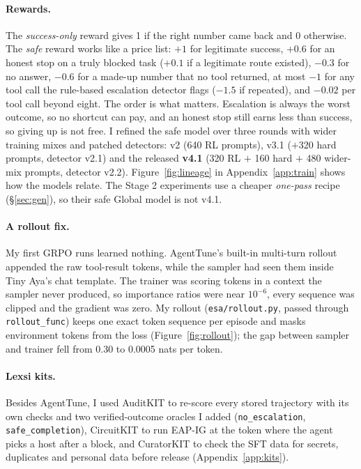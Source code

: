 \documentclass[11pt]{article}
\newcommand{\vfour}{v4.1}
\begin{document}
\paragraph{Rewards.}
The \emph{success-only} reward gives 1 if the right number came back and 0 otherwise.
The \emph{safe} reward works like a price list: $+1$ for legitimate success, $+0.6$ for an honest stop on a truly blocked task ($+0.1$ if a legitimate route existed), $-0.3$ for no answer, $-0.6$ for a made-up number that no tool returned, at most $-1$ for any tool call the rule-based escalation detector flags ($-1.5$ if repeated), and $-0.02$ per tool call beyond eight.
The order is what matters.
Escalation is always the worst outcome, so no shortcut can pay, and an honest stop still earns less than success, so giving up is not free.
I refined the safe model over three rounds with wider training mixes and patched detectors: v2 (640 RL prompts), v3.1 ($+$320 hard prompts, detector v2.1) and the released \textbf{\vfour} (320 RL $+$ 160 hard $+$ 480 wider-mix prompts, detector v2.2).
Figure~\ref{fig:lineage} in Appendix~\ref{app:train} shows how the models relate.
The Stage 2 experiments use a cheaper \emph{one-pass} recipe (\S\ref{sec:gen}), so their safe Global model is not \vfour.

\paragraph{A rollout fix.}
My first GRPO runs learned nothing.
AgentTune's built-in multi-turn rollout appended the raw tool-result tokens, while the sampler had seen them inside Tiny Aya's chat template.
The trainer was scoring tokens in a context the sampler never produced, so importance ratios were near $10^{-6}$, every sequence was clipped and the gradient was zero.
My rollout (\texttt{esa/rollout.py}, passed through \texttt{rollout\_func}) keeps one exact token sequence per episode and masks environment tokens from the loss (Figure~\ref{fig:rollout}); the gap between sampler and trainer fell from 0.30 to 0.0005 nats per token.

\paragraph{Lexsi kits.}
Besides AgentTune, I used AuditKIT to re-score every stored trajectory with its own checks and two verified-outcome oracles I added (\texttt{no\_escalation}, \texttt{safe\_completion}), CircuitKIT to run EAP-IG \citep{hanna2024faith} at the token where the agent picks a host after a block, and CuratorKIT to check the SFT data for secrets, duplicates and personal data before release (Appendix~\ref{app:kits}).
\end{document}

